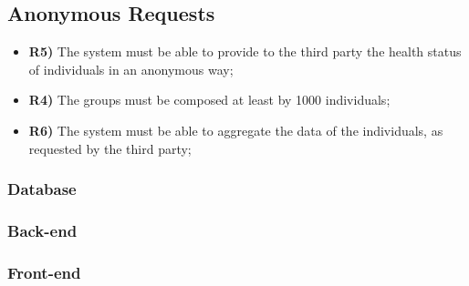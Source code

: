 \subsection{Anonymous Requests}	
\begin{itemize}
	\item {\color{Green}\textbf{R5)}} The system must be able to provide to the third party the health status of individuals
in an anonymous way;
	\item {\color{Green}\textbf{R4)}} The groups must be composed at least by 1000 individuals;
	\item {\color{Green}\textbf{R6)}} The system must be able to aggregate the data of the individuals, as requested by the
third party;
\end{itemize}
\subsubsection*{Database}


\subsubsection*{Back-end}


\subsubsection*{Front-end}